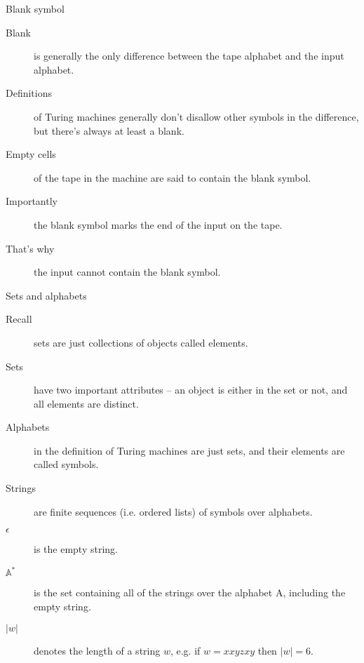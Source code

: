 \begin{frame}{Blank symbol}

\begin{description}
  \item[Blank] is generally the only difference between the tape alphabet and the input alphabet.
  \item[Definitions] of Turing machines generally don't disallow other symbols in the difference, but there's always at least a blank.
  \item[Empty cells] of the tape in the machine are said to contain the blank symbol.
  \item[Importantly] the blank symbol marks the end of the input on the tape.
  \item[That's why] the input cannot contain the blank symbol.
\end{description}

\end{frame}


\begin{frame}{Sets and alphabets}

\begin{description}
  \item[Recall] sets are just collections of objects called elements.
  \item[Sets] have two important attributes -- an object is either in the set or not, and all elements are distinct.
  \item[Alphabets] in the definition of Turing machines are just sets, and their elements are called symbols.
  \item[Strings] are finite sequences (i.e. ordered lists) of symbols over alphabets.
  \item[$\epsilon$] is the empty string.
  \item[$\mathbb{A}^*$] is the set containing all of the strings over the alphabet A, including the empty string.
  \item[$|w|$] denotes the length of a string $w$, e.g. if $w = xxyzxy$ then $|w| = 6$.
\end{description}
\end{frame}

